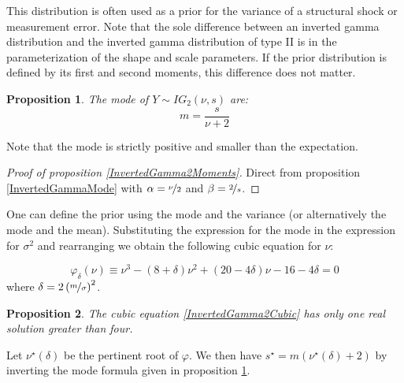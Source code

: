 \documentclass{amsart}
\theoremstyle{plain}
\newtheorem{proposition}{Proposition}[section]
\theoremstyle{remark}
\numberwithin{equation}{section}
\begin{document}
This distribution is often used as a prior for the variance of a structural shock
or measurement error. Note that the sole difference between an inverted gamma
distribution and the inverted gamma distribution of type II is in the parameterization of the
shape and scale parameters. If the prior distribution is defined by its first and
second moments, this difference does not matter.\newline

\begin{proposition}\label{InvertedGamma2Mode}
  The mode of $Y\sim IG_2(\nu, s)$ are:
  \[
    m = \frac{s}{\nu+2}
  \]
\end{proposition}

Note that the mode is strictly positive and smaller than the expectation.

\begin{proof}[Proof of proposition \ref{InvertedGamma2Moments}]
  Direct from proposition \ref{InvertedGammaMode} with $\alpha=\nicefrac{\nu}{2}$ and $\beta=\nicefrac{2}{s}$.
\end{proof}

One can define the prior using the mode and the variance (or alternatively the
mode and the mean). Substituting the expression for the mode in the expression
for $\sigma^2$ and rearranging we obtain the following cubic equation for $\nu$:

\begin{equation}\label{InvertedGamma2Cubic}
\varphi_{\delta}(\nu) \equiv \nu^3 - (8+\delta)\nu^2 + (20-4\delta)\nu - 16 -4\delta = 0
\end{equation}
where $\delta = 2\left(\nicefrac{m}{\sigma}\right)^2$.

\begin{proposition}\label{InvertedGamma2SolveCubic}
  The cubic equation \eqref{InvertedGamma2Cubic} has only one real solution greater than four.
\end{proposition}

Let $\nu^{\star}(\delta)$ be the pertinent root of $\varphi$. We then have $s^{\star} = m(\nu^{\star}(\delta)+2)$ by inverting
the mode formula given in proposition \ref{InvertedGamma2Mode}.
\end{document}

